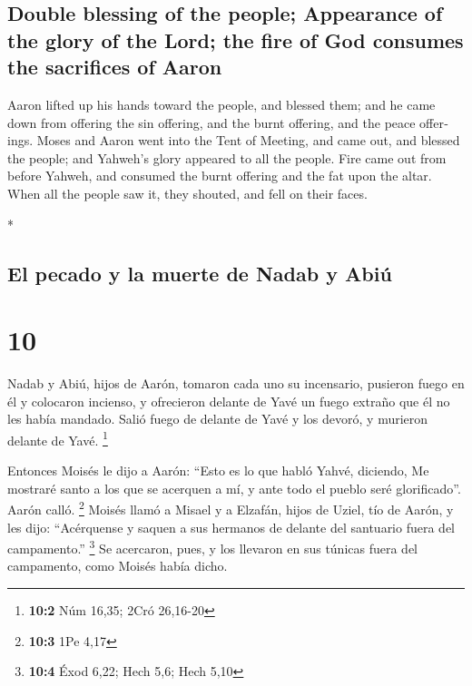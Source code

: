 \begin{paracol}{2}
\begin{otherlanguage}{english}
\hypertarget{double-blessing-of-the-people-appearance-of-the-glory-of-the-lord-the-fire-of-god-consumes-the-sacrifices-of-aaron}{%
\subsection{Double blessing of the people; Appearance of the glory of
the Lord; the fire of God consumes the sacrifices of
Aaron}\label{double-blessing-of-the-people-appearance-of-the-glory-of-the-lord-the-fire-of-god-consumes-the-sacrifices-of-aaron}}

 Aaron lifted up his hands toward the people, and blessed
them; and he came down from offering the sin offering, and the burnt
offering, and the peace offerings.  Moses and Aaron went
into the Tent of Meeting, and came out, and blessed the people; and
Yahweh's glory appeared to all the people.  Fire came out
from before Yahweh, and consumed the burnt offering and the fat upon the
altar. When all the people saw it, they shouted, and fell on their
faces.

\end{otherlanguage}

\switchcolumn[0]*

\hypertarget{el-pecado-y-la-muerte-de-nadab-y-abiuxfa}{%
\subsection{El pecado y la muerte de Nadab y
Abiú}\label{el-pecado-y-la-muerte-de-nadab-y-abiuxfa}}

\hypertarget{section-18}{%
\section{10}\label{section-18}}

 Nadab y Abiú, hijos de Aarón, tomaron cada uno su
incensario, pusieron fuego en él y colocaron incienso, y ofrecieron
delante de Yavé un fuego extraño que él no les había mandado.
 Salió fuego de delante de Yavé y los devoró, y murieron
delante de Yavé. \footnote{\textbf{10:2} Núm 16,35; 2Cró 26,16-20}

 Entonces Moisés le dijo a Aarón: ``Esto es lo que habló
Yahvé, diciendo, Me mostraré santo a los que se acerquen a mí, y ante
todo el pueblo seré glorificado''. Aarón calló. \footnote{\textbf{10:3}
  1Pe 4,17}  Moisés llamó a Misael y a Elzafán, hijos de
Uziel, tío de Aarón, y les dijo: ``Acérquense y saquen a sus hermanos de
delante del santuario fuera del campamento.'' \footnote{\textbf{10:4}
  Éxod 6,22; Hech 5,6; Hech 5,10}  Se acercaron, pues, y
los llevaron en sus túnicas fuera del campamento, como Moisés había
dicho.


\end{paracol}
